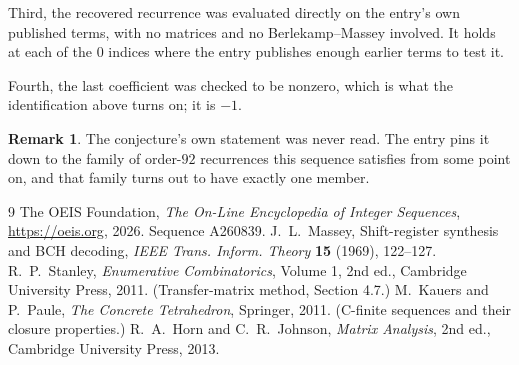 \documentclass[11pt,a4paper]{article}
\theoremstyle{plain}
\theoremstyle{definition}
\newtheorem{remark}[theorem]{Remark}
\begin{document}
Third, the recovered recurrence was evaluated directly on the entry's own published terms, with
no matrices and no Berlekamp--Massey involved. It holds at each of the $0$ indices where
the entry publishes enough earlier terms to test it.

Fourth, the last coefficient was checked to be nonzero, which is what the identification above
turns on; it is $-1$.

\begin{remark}
The conjecture's own statement was never read. The entry pins it down to the family of
order-$92$ recurrences this sequence satisfies from some point on, and that family turns
out to have exactly one member.
\end{remark}

\begin{thebibliography}{9}
 The OEIS Foundation, \emph{The On-Line Encyclopedia of Integer
Sequences}, \url{https://oeis.org}, 2026. Sequence A260839.
 J.~L.~Massey, Shift-register synthesis and BCH decoding, \emph{IEEE
Trans. Inform. Theory} \textbf{15} (1969), 122--127.
 R.~P.~Stanley, \emph{Enumerative Combinatorics}, Volume 1, 2nd ed.,
Cambridge University Press, 2011. (Transfer-matrix method, Section 4.7.)
 M.~Kauers and P.~Paule, \emph{The Concrete Tetrahedron}, Springer, 2011.
(C-finite sequences and their closure properties.)
 R.~A.~Horn and C.~R.~Johnson, \emph{Matrix Analysis}, 2nd ed., Cambridge
University Press, 2013.
\end{thebibliography}
\end{document}
